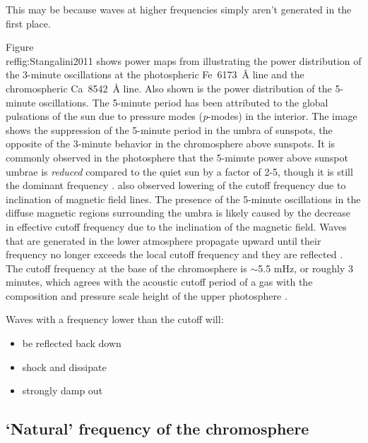 
This may be because waves at higher frequencies simply aren't generated
in the first place.



Figure~\\ref{fig:Stangalini2011} shows power maps from
\cite{Stangalini2011} illustrating the power distribution of the
3-minute oscillations at the photospheric Fe~6173~\AA{} line and the
chromospheric Ca~8542~\AA{} line. Also shown is the power distribution
of the 5-minute oscillations. The 5-minute period has been attributed
to the global pulsations of the sun due to pressure modes
(\textit{p}-modes) in the interior. The image shows the suppression of
the 5-minute period in the umbra of sunspots, the opposite of the
3-minute behavior in the chromosphere above sunspots. It is commonly
observed in the photosphere that the 5-minute power above sunspot
umbrae is \emph{reduced} compared to the quiet sun by a factor of 2-5,
though it is still the dominant frequency
\citep{Felipe2010, Bogdan2006}.
\cite{Reznikova2012} also observed lowering of the cutoff frequency
due to inclination of magnetic field lines.
The presence of the 5-minute oscillations in the diffuse magnetic regions
surrounding the umbra is likely caused by the decrease in effective
cutoff frequency due to the inclination of the magnetic field. Waves
that are generated in the lower atmosphere propagate upward until
their frequency no longer exceeds the local cutoff frequency and they
are reflected \citep{DeMoortel2000, Brynildsen1999}. The cutoff
frequency at the base of the chromosphere is $\sim$5.5 mHz, or roughly
3 minutes, which agrees with the acoustic cutoff period of a gas with
the composition and pressure scale height of the upper photosphere
\citep{Kalkofen1994}.

Waves with a frequency lower than the cutoff will:
\begin{itemize}
    \item be reflected back down
    \item shock and dissipate
    \item strongly damp out
\end{itemize}

\subsection{`Natural' frequency of the chromosphere}

